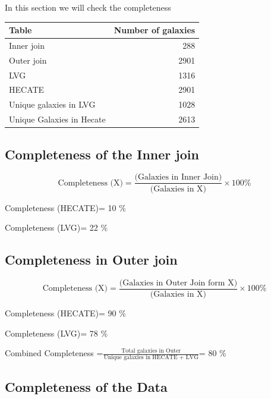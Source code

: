 \documentclass[
]{article}
\begin{document}
In this section we will check the completeness

\begin{longtable}[]{@{}lr@{}}
\toprule\noalign{}
Table & Number of galaxies \\
\midrule\noalign{}
\endhead
\bottomrule\noalign{}
\endlastfoot
Inner join & 288 \\
Outer join & 2901 \\
LVG & 1316 \\
HECATE & 2901 \\
Unique galaxies in LVG & 1028 \\
Unique Galaxies in Hecate & 2613 \\
\end{longtable}

\subsection{Completeness of the Inner
join}\label{completeness-of-the-inner-join}

\[
\text{Completeness (X)}=\frac{\text{(Galaxies in Inner Join)}}{\text{(Galaxies in X)}}×100\%
\]

Completeness (HECATE)= 10 \%

Completeness (LVG)= 22 \%

\subsection{Completeness in Outer
join}\label{completeness-in-outer-join}

\[
\text{Completeness (X)}=\frac{\text{(Galaxies in Outer Join form X)}}{\text{(Galaxies in X)}}×100\%
\]

Completeness (HECATE)= 90 \%

Completeness (LVG)= 78 \%

Combined Completeness
=\(\frac{\text{Total galaxies in Outer}}{\text{Unique galaxies in HECATE + LVG}}\)=
80 \%

\subsection{Completeness of the Data}\label{completeness-of-the-data}
\end{document}
